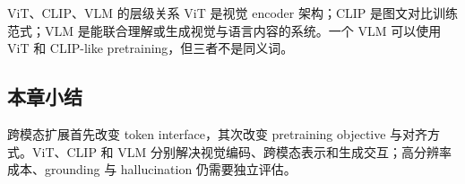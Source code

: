 \begin{knowledgebox}{ViT、CLIP、VLM 的层级关系}
ViT 是视觉 encoder 架构；CLIP 是图文对比训练范式；VLM 是能联合理解或生成视觉与语言内容的系统。一个 VLM 可以使用 ViT 和 CLIP-like pretraining，但三者不是同义词。
\end{knowledgebox}

\subsection{本章小结}

跨模态扩展首先改变 token interface，其次改变 pretraining objective 与对齐方式。ViT、CLIP 和 VLM 分别解决视觉编码、跨模态表示和生成交互；高分辨率成本、grounding 与 hallucination 仍需要独立评估。

